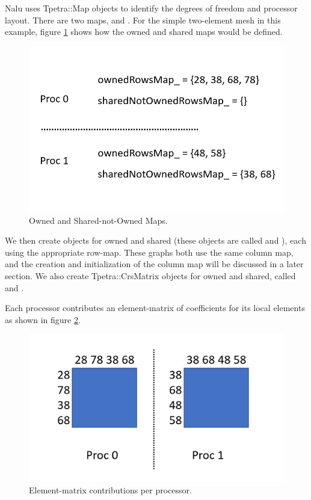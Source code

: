 Nalu uses Tpetra::Map objects to identify the degrees of freedom and processor layout.
There are two maps,  and .
For the simple two-element mesh in this example, figure \ref{maps1}
shows how the owned and shared maps would be defined.

\begin{figure}[ht]
\centering
\includegraphics[scale=0.7]{figures/maps1.jpg}
\caption{Owned and Shared-not-Owned Maps.}
\label{maps1}
\end{figure}

We then create  objects for owned and shared
(these objects are called
 and ), each using the appropriate
row-map. These graphs both use the same column map, and the creation and
initialization of the column map will be discussed in a later section.
We also create Tpetra::CrsMatrix objects for owned and shared, called
 and .

Each processor contributes an element-matrix of coefficients for its local
elements as shown in figure \ref{elemContribs1}.

\begin{figure}[ht]
\centering
\includegraphics[scale=0.5]{figures/elemContribs.jpg}
\caption{Element-matrix contributions per processor.}
\label{elemContribs1}
\end{figure}

